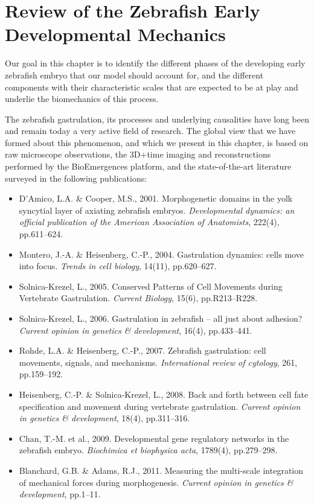 

\section{Review of the Zebrafish Early Developmental Mechanics}

Our goal in this chapter is to identify the different phases of the developing early zebrafish embryo that our model should account for, and the different components with their characteristic scales that are expected to be at play and underlie the biomechanics of this process.

The zebrafish gastrulation, its processes and underlying causalities have long been and remain today a very active field of research. The global view that we have formed about this phenomenon, and which we present in this chapter, is based on raw microscope observations, the 3D+time imaging and reconstructions performed by the BioEmergences platform, and the state-of-the-art literature surveyed in the following publications:
\begin{itemize}
	\item D'Amico, L.A. \& Cooper, M.S., 2001. Morphogenetic domains in the yolk syncytial layer of axiating zebrafish embryos. \textit{Developmental dynamics: an official publication of the American Association of Anatomists}, 222(4), pp.611–624. \cite{DAmico:2001ic}
	\item Montero, J.-A. \& Heisenberg, C.-P., 2004. Gastrulation dynamics: cells move into focus. \textit{Trends in cell biology}, 14(11), pp.620–627. \cite{Montero:2004hh}
	\item Solnica-Krezel, L., 2005. Conserved Patterns of Cell Movements during Vertebrate Gastrulation. \textit{Current Biology}, 15(6), pp.R213–R228. \cite{SolnicaKrezel:2005uz}
	\item Solnica-Krezel, L., 2006. Gastrulation in zebrafish -- all just about adhesion? \textit{Current opinion in genetics \& development}, 16(4), pp.433–441. \cite{SolnicaKrezel:2006dl}
	\item Rohde, L.A. \& Heisenberg, C.-P., 2007. Zebrafish gastrulation: cell movements, signals, and mechanisms. \textit{International review of cytology}, 261, pp.159–192. \cite{Rohde:2007ba}
	\item Heisenberg, C.-P. \& Solnica-Krezel, L., 2008. Back and forth between cell fate specification and movement during vertebrate gastrulation. \textit{Current opinion in genetics \& development}, 18(4), pp.311–316. \cite{Heisenberg:2008fc}
	\item Chan, T.-M. et al., 2009. Developmental gene regulatory networks in the zebrafish embryo. \textit{Biochimica et biophysica acta}, 1789(4), pp.279–298.\cite{Chan:2009er}
	\item Blanchard, G.B. \& Adams, R.J., 2011. Measuring the multi-scale integration of mechanical forces during morphogenesis. \textit{Current opinion in genetics \& development}, pp.1–11.\cite{Blanchard:2011hk}
\end{itemize}

